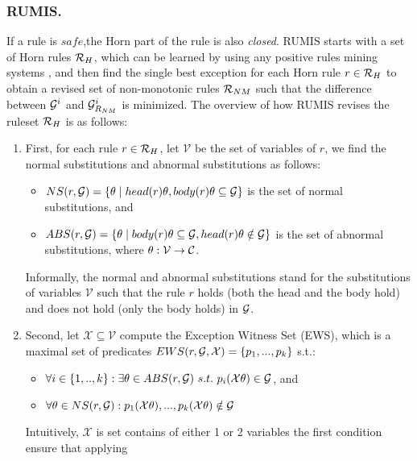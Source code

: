 \subsubsection{RUMIS.} If a rule is $safe$,the Horn part of the rule is also \textit{closed}. RUMIS starts with a set of Horn rules $\mathcal{R}_H$, which can be learned by using any positive rules mining systems \cite{amie,op,rdf2rules}, and then find the single best exception for each Horn rule $r \in \mathcal{R}_H$ to obtain a revised set of non-monotonic rules $\mathcal{R}_{NM}$ such that the difference between $\mathcal{G}^i$ and $\mathcal{G}^i_{R_{NM}}$ is minimized. The overview of how RUMIS revises the ruleset $\mathcal{R}_H$ is as follows:
\begin{enumerate}
\item First, for each rule $r \in \mathcal{R}_H$, let $\mathcal{V}$ be the set of variables of $r$, we find the normal substitutions and abnormal substitutions as follows:
\begin{itemize}
\item $NS(r, \mathcal{G}) = \{\theta \mid head(r)\theta, body(r)\theta \subseteq \mathcal{G}\}$ is the set of normal substitutions, and
\item $ABS(r, \mathcal{G}) = \{\theta \mid body(r)\theta \subseteq \mathcal{G} , head(r)\theta \notin \mathcal{G}\}$ is the set of abnormal substitutions,
where $\theta: \mathcal{V} \rightarrow \mathcal{C}$.
\end{itemize}
Informally, the normal and abnormal substitutions stand for the substitutions of variables $\mathcal{V}$ such that the rule $r$ holds (both the head and the body hold) and does not hold (only the body holds) in $\mathcal{G}$.

\item Second, let $\mathcal{X} \subseteq \mathcal{V}$ compute the Exception Witness Set (EWS), which is a maximal set of predicates $EWS(r,\mathcal{G},\mathcal{X}) = \{p_1,...,p_k\}$ s.t.:
\begin{itemize}
\item $\forall i \in \{1,..,k\} : \exists \theta \in ABS(r, \mathcal{G})\ s.t.\ p_i(\mathcal{X}\theta) \in \mathcal{G}$, and 
\item $\forall \theta \in NS(r,\mathcal{G}) :  p_1(\mathcal{X}\theta), ...,p_k(\mathcal{X}\theta) \notin \mathcal{G}$
\end{itemize}
Intuitively, $\mathcal{X}$ is set contains of either 1 or 2 variables the first condition ensure that applying
\end{enumerate}
